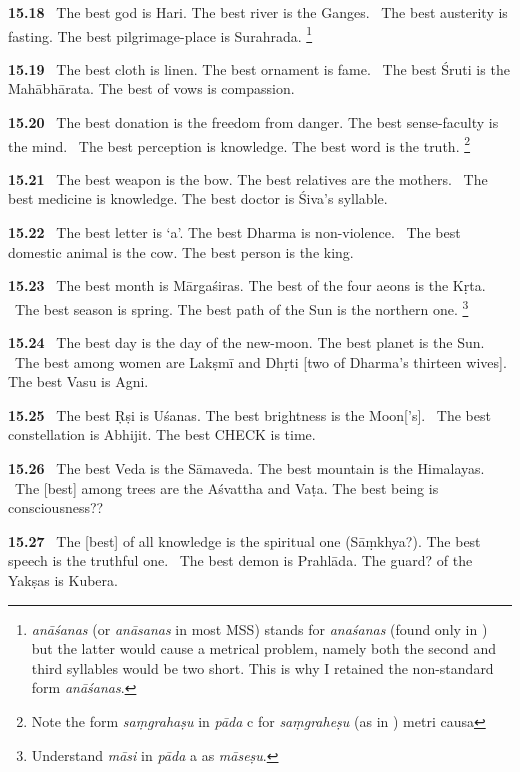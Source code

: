 \documentclass{article}
\newcommand{\skt}[1]{\textit{#1}}
\begin{document}
\textbf{15.18}%
\ The best god is Hari. The best river is the Ganges.%
\                   The best austerity is fasting. The best pilgrimage-place is Surahrada.%
\footnote{\skt{anāśanas} (or \skt{anāsanas} in most MSS) stands for \skt{anaśanas} (found only in \msNc) but the latter would cause                 a metrical problem, namely both the second and third syllables would be two short. This is why I retained                        the non-standard form \skt{anāśanas}. }%


\textbf{15.19}%
\ The best cloth is linen. The best ornament is fame.%
\                  The best Śruti is the Mahābhārata. The best of vows is compassion.%


\textbf{15.20}%
\ The best donation is the freedom from danger. The best sense-faculty is the mind.%
\                  The best perception is knowledge. The best word is the truth.%
\footnote{Note the form \skt{saṃgrahaṣu} in \skt{pāda} c for \skt{saṃgraheṣu} (as in \msNc) metri causa }%


\textbf{15.21}%
\ The best weapon is the bow. The best relatives are the mothers.%
\                  The best medicine is knowledge. The best doctor is Śiva's syllable.%


\textbf{15.22}%
\ The best letter is `a'. The best Dharma is non-violence.%
\                  The best domestic animal is the cow. The best person is the king.%


\textbf{15.23}%
\ The best month is Mārgaśiras. The best of the four aeons is the Kṛta.%
\                 The best season is spring. The best path of the Sun is the northern one.%
\footnote{Understand \skt{māsi} in \skt{pāda} a as \skt{māseṣu}. }%


\textbf{15.24}%
\ The best day is the day of the new-moon. The best planet is the Sun.%
\                   The best among women are Lakṣmī and Dhṛti [two of Dharma's thirteen wives]. The best Vasu is Agni.%


\textbf{15.25}%
\ The best Ṛṣi is Uśanas. The best brightness is the Moon['s].%
\                  The best constellation is Abhijit. The best CHECK is time.%


\textbf{15.26}%
\ The best Veda is the Sāmaveda. The best mountain is the Himalayas.%
\                  The [best] among trees are the Aśvattha and Vaṭa. The best being is consciousness??%


\textbf{15.27}%
\ The [best] of all knowledge is the spiritual one (Sāṃkhya?). The best speech is the truthful one.%
\                   The best demon is Prahlāda. The guard? of the Yakṣas is Kubera.%
\end{document}
